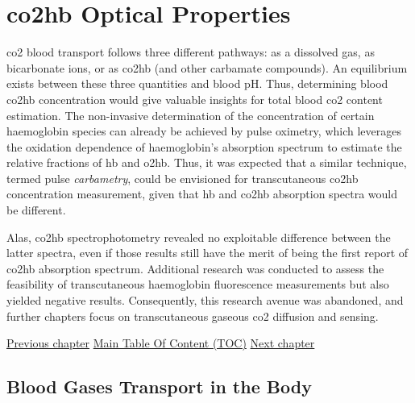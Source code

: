 \chapter{\texorpdfstring{\gls{co2hb}}{Carbamino-Haemoglobin (CO2Hb)} Optical Properties}\label{chap:co2hb}

\begin{tldrbox}
	
	\gls{co2} blood transport follows three different pathways: as a dissolved gas, as bicarbonate ions, or as \gls{co2hb} (and other carbamate compounds). An equilibrium exists between these three quantities and blood pH. Thus, determining blood \gls{co2hb} concentration would give valuable insights for total blood \gls{co2} content estimation. The non-invasive determination of the concentration of certain haemoglobin species can already be achieved by pulse oximetry, which leverages the oxidation dependence of haemoglobin's absorption spectrum to estimate the relative fractions of \gls{hb} and \gls{o2hb}. Thus, it was expected that a similar technique, termed pulse \emph{carbametry}, could be envisioned for transcutaneous \gls{co2hb} concentration measurement, given that \gls{hb} and \gls{co2hb} absorption spectra would be different.
	
	Alas, \gls{co2hb} spectrophotometry revealed no exploitable difference between the latter spectra, even if those results still have the merit of being the first report of \gls{co2hb} absorption spectrum. Additional research was conducted to assess the feasibility of transcutaneous haemoglobin fluorescence measurements but also yielded negative results. Consequently, this research avenue was abandoned, and further chapters focus on transcutaneous gaseous \gls{co2} diffusion and sensing.
	
	\tcblower
	
	\hyperref[chap:intro]{Previous chapter} \hfill \hyperref[chapter:toc]{Main Table Of Content (TOC)} \hfill \hyperref[chap:tcco2]{Next chapter}
	
\end{tldrbox}

\section{Blood Gases Transport in the Body}\label{sect:co2hb:blood_gases}

